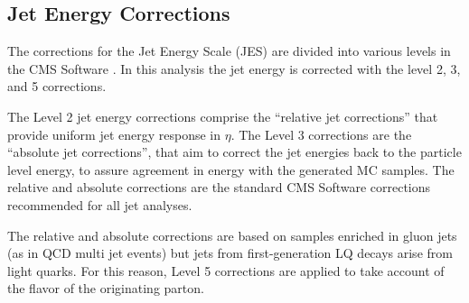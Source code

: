 
\subsection{Jet Energy Corrections}

The corrections for the Jet Energy Scale (JES) are divided into various levels in the CMS Software \cite{JES}.  
In this analysis the jet energy is corrected with the level 2, 3, and 5 corrections.

The Level 2 jet energy corrections comprise the 
``relative jet corrections'' that provide uniform jet energy response in $\eta$.  
The Level 3 corrections are the ``absolute jet corrections'', that aim to correct  the jet energies 
back to the particle level energy, to assure agreement in energy with the generated MC samples. 
The relative and absolute corrections are the standard CMS Software corrections recommended for all jet analyses.

The relative and absolute corrections are based on samples enriched in gluon jets (as in QCD multi jet events) but jets from 
first-generation LQ decays arise from light quarks. 
For this reason, Level 5 corrections are applied to take account of the flavor of the originating parton.

